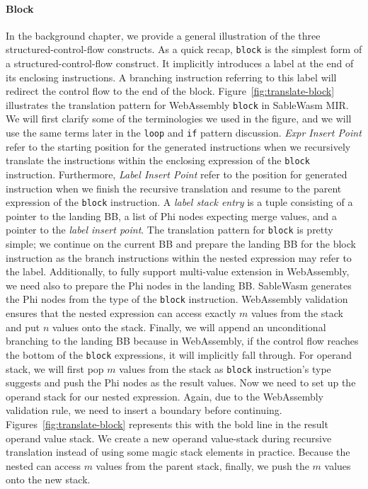 \paragraph{Block} In the background chapter, we provide a general illustration of the three structured-control-flow constructs.  As a quick recap, \texttt{block} is the simplest form of a structured-control-flow construct. It implicitly introduces a label at the end of its enclosing instructions. A branching instruction referring to this label will redirect the control flow to the end of the block. Figure~\ref{fig:translate-block} illustrates the translation pattern for WebAssembly \texttt{block} in SableWasm MIR.  We will first clarify some of the terminologies we used in the figure, and we will use the same terms later in the \texttt{loop} and \texttt{if} pattern discussion. \emph{Expr Insert Point} refer to the starting position for the generated instructions when we recursively translate the instructions within the enclosing expression of the \texttt{block} instruction. Furthermore, \emph{Label Insert Point} refer to the position for generated instruction when we finish the recursive translation and resume to the parent expression of the \texttt{block} instruction. A \emph{label stack entry} is a tuple consisting of a pointer to the landing BB, a list of Phi nodes expecting merge values, and a pointer to the \emph{label insert point}. The translation pattern for \texttt{block} is pretty simple; we continue on the current BB and prepare the landing BB for the block instruction as the branch instructions within the nested expression may refer to the label. Additionally, to fully support multi-value extension in WebAssembly, we need also to prepare the Phi nodes in the landing BB. SableWasm generates the Phi nodes from the type of the \texttt{block} instruction. WebAssembly validation ensures that the nested expression can access exactly $m$ values from the stack and put $n$ values onto the stack. Finally, we will append an unconditional branching to the landing BB because in WebAssembly, if the control flow reaches the bottom of the \texttt{block} expressions, it will implicitly fall through. For operand stack, we will first pop $m$ values from the stack as \texttt{block} instruction's type suggests and push the Phi nodes as the result values. Now we need to set up the operand stack for our nested expression. Again, due to the WebAssembly validation rule, we need to insert a boundary before continuing. Figures~\ref{fig:translate-block} represents this with the bold line in the result operand value stack. We create a new operand value-stack during recursive translation instead of using some magic stack elements in practice.  Because the nested can access $m$ values from the parent stack, finally, we push the $m$ values onto the new stack.


